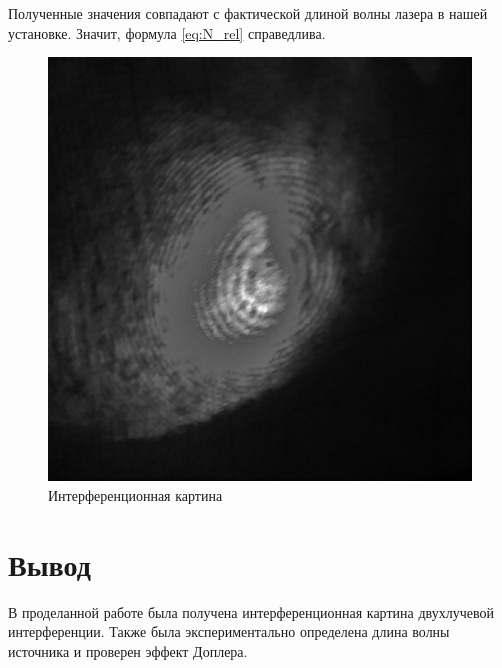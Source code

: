 \documentclass[a4paper,12pt]{article}
\begin{document}
	Полученные значения совпадают с фактической длиной волны лазера в нашей установке. Значит, формула \eqref{eq:N_rel} справедлива.
	
	\begin{figure}[h!]\label{fig:picture}
		\begin{center}
			\includegraphics[width = 0.3\linewidth]{picture}
			\caption{Интерференционная картина}
		\end{center}
	\end{figure}
	
	\section{Вывод}
	
	В проделанной работе была получена интерференционная картина двухлучевой интерференции. Также была экспериментально определена длина волны источника и проверен эффект Доплера.
\end{document}
